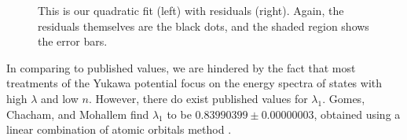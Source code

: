 \documentclass[12pt,twoside]{reedthesis}
\begin{document}
\begin{figure}[h]
\centering
{}
\caption[Quadratic fit and residuals]{This is our quadratic fit (left) with residuals (right). Again, the residuals themselves are the black dots, and the shaded region shows the error bars.}
\label{fig:quadfit}
\end{figure}



In comparing to published values, we are hindered by the fact that most treatments of the Yukawa potential focus on the energy spectra of states with high $\lambda$ and low $n$. However, there do exist published values for $\lambda_1$. Gomes, Chacham, and Mohallem find  $\lambda_1$ to be $0.83990399 \pm 0.00000003$, obtained using a linear combination of atomic orbitals method \cite{PhysRevA.50.228}.
\end{document}
